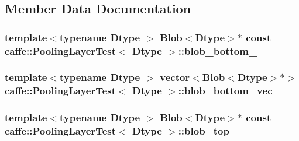 \subsection{Member Data Documentation}
\hypertarget{classcaffe_1_1_pooling_layer_test_ad6228ca6fb50a4e589f18fd314be0019}{
\subsubsection[{blob\+\_\+bottom\+\_\+}]{\setlength{\rightskip}{0pt plus 5cm}template$<$typename Dtype $>$ {\bf Blob}$<$Dtype$>$$\ast$ const {\bf caffe\+::\+Pooling\+Layer\+Test}$<$ Dtype $>$\+::blob\+\_\+bottom\+\_\+\hspace{0.3cm}{\ttfamily [protected]}}}\label{classcaffe_1_1_pooling_layer_test_ad6228ca6fb50a4e589f18fd314be0019}
\hypertarget{classcaffe_1_1_pooling_layer_test_a4441920a9bb7a9e7aac0a7298da8b13b}{
\subsubsection[{blob\+\_\+bottom\+\_\+vec\+\_\+}]{\setlength{\rightskip}{0pt plus 5cm}template$<$typename Dtype $>$ vector$<${\bf Blob}$<$Dtype$>$$\ast$$>$ {\bf caffe\+::\+Pooling\+Layer\+Test}$<$ Dtype $>$\+::blob\+\_\+bottom\+\_\+vec\+\_\+\hspace{0.3cm}{\ttfamily [protected]}}}\label{classcaffe_1_1_pooling_layer_test_a4441920a9bb7a9e7aac0a7298da8b13b}
\hypertarget{classcaffe_1_1_pooling_layer_test_aadabc8d33eec24086aedbf96c963518c}{
\subsubsection[{blob\+\_\+top\+\_\+}]{\setlength{\rightskip}{0pt plus 5cm}template$<$typename Dtype $>$ {\bf Blob}$<$Dtype$>$$\ast$ const {\bf caffe\+::\+Pooling\+Layer\+Test}$<$ Dtype $>$\+::blob\+\_\+top\+\_\+\hspace{0.3cm}{\ttfamily [protected]}}}\label{classcaffe_1_1_pooling_layer_test_aadabc8d33eec24086aedbf96c963518c}
